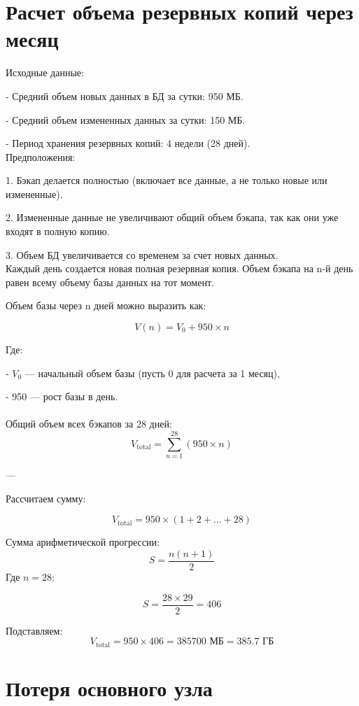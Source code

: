 \documentclass{article}
\begin{document}
\section*{Расчет объема резервных копий через месяц}

Исходные данные:

- Средний объем новых данных в БД за сутки: 950 МБ.

- Средний объем измененных данных за сутки: 150 МБ.

- Период хранения резервных копий: 4 недели (28 дней).
\\
Предположения:

1. Бэкап делается полностью (включает все данные, а не только новые или измененные).

2. Измененные данные не увеличивают общий объем бэкапа, так как они уже входят в полную копию.

3. Объем БД увеличивается со временем за счет новых данных.
\\
Каждый день создается новая полная резервная копия.  
Объем бэкапа на n-й день равен всему объему базы данных на тот момент.

Объем базы через n дней можно выразить как:

\[
V(n) = V_0 + 950 \times n
\]

Где:

- \( V_0 \) — начальный объем базы (пусть 0 для расчета за 1 месяц),

- 950 — рост базы в день.
\\ \\
Общий объем всех бэкапов за 28 дней:
\[
V_{\text{total}} = \sum_{n=1}^{28} (950 \times n)
\]

---

Рассчитаем сумму:

\[
V_{\text{total}} = 950 \times (1 + 2 + ... + 28)
\]

Сумма арифметической прогрессии:
\[
S = \frac{n (n+1)}{2}
\]
Где \( n = 28 \):

\[
S = \frac{28 \times 29}{2} = 406
\]

Подставляем:
\[
V_{\text{total}} = 950 \times 406 = 385 700 \text{ МБ} = 385.7 \text{ ГБ}
\]

\section*{Потеря основного узла}
\end{document}
